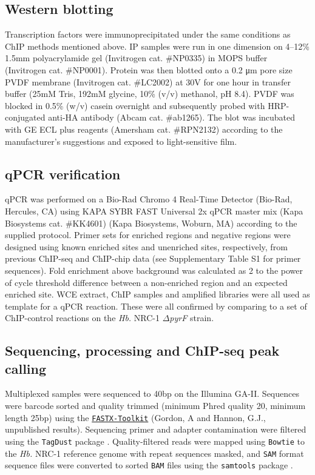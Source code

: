 \subsection{Western blotting}

Transcription factors were immunoprecipitated under the same conditions as ChIP methods mentioned above. IP samples were run in one dimension on 4--12\% 1.5mm polyacrylamide gel (Invitrogen cat. \#NP0335) in MOPS buffer (Invitrogen cat. \#NP0001). Protein was then blotted onto a 0.2 \si{\micro\meter} pore size PVDF membrane (Invitrogen cat. \#LC2002) at 30V for one hour in transfer buffer (25mM Tris, 192mM glycine, 10\% (v/v) methanol, pH 8.4). PVDF was blocked in 0.5\% (w/v) casein overnight and subsequently probed with HRP-conjugated anti-HA antibody (Abcam cat. \#ab1265). The blot was incubated with GE ECL plus reagents (Amersham cat. \#RPN2132) according to the manufacturer's suggestions and exposed to light-sensitive film.

\subsection{qPCR verification}

qPCR was performed on a Bio-Rad Chromo 4 Real-Time Detector (Bio-Rad, Hercules, CA) using KAPA SYBR FAST Universal 2x qPCR master mix (Kapa Biosystems cat. \#KK4601) (Kapa Biosystems, Woburn, MA) according to the supplied protocol. Primer sets for enriched regions and negative regions were designed using known enriched sites and unenriched sites, respectively, from previous ChIP-seq and ChIP-chip data (see Supplementary Table S1 for primer sequences). Fold enrichment above background was calculated as 2 to the power of cycle threshold difference between a non-enriched region and an expected enriched site. WCE extract, ChIP samples and amplified libraries were all used as template for a qPCR reaction. These were all confirmed by comparing to a set of ChIP-control reactions on the {\em Hb.} NRC-1 $\Delta${\em pyrF}  strain.

\subsection{Sequencing, processing and ChIP-seq peak calling}

Multiplexed samples were sequenced to 40bp on the Illumina GA-II. Sequences were barcode sorted and quality trimmed (minimum Phred quality 20, minimum length 25bp) using the \href{http://hannonlab.cshl.edu/fastx_toolkit/}{\tt FASTX-Toolkit} (Gordon, A and Hannon, G.J., unpublished results). Sequencing primer and adapter contamination were filtered using the {\tt TagDust} package \cite{lassmann_tagdust-program_2009}. Quality-filtered reads were mapped using {\tt Bowtie} \cite{langmead2009ultrafast} to the {\em Hb.} NRC-1 reference genome with repeat sequences masked, and {\tt SAM} format sequence files were converted to sorted {\tt BAM} files using the {\tt samtools} package \cite{li_sequence_2009}.

